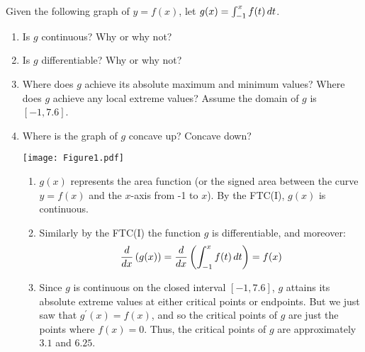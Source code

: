 \documentclass[nooutcomes]{ximera}
\begin{document}
\begin{problem}
Given the following graph of $y=f(x)$, let $g(x) = \int_{-1}^x f(t) \,d t$.
	\begin{enumerate}
	
	\item  Is $g$ continuous?  Why or why not?
		
		
		
		
	\item  Is $g$ differentiable?  Why or why not?
		
		
		
		
	\item  Where does $g$ achieve its absolute maximum and minimum values?  Where does $g$ achieve any local extreme values?  Assume the domain of $g$ is $[-1,7.6]$.
		
		
		
		
	\item  Where is the graph of $g$ concave up?  Concave down?
		
		
\begin{image}
\texttt{[image: Figure1.pdf]}
\end{image}

		\begin{freeResponse}
			\begin{enumerate}
			\item  $g(x)$ represents the area function (or the signed area between the curve$y=f(x)$ and the $x$-axis from -1 to $x$).  By the FTC(I), $g(x)$ is continuous.
			
			\item  Similarly by the FTC(I) the function $g$ is differentiable, and moreover:
			$$\frac{d}{dx} \left( g(x) \right) = \frac{d}{dx} \left( \int_{-1}^x f(t) \,d t \right)= f(x)$$
			
			\item  Since $g$ is continuous on the closed interval $[-1,7.6]$, $g$ attains its absolute extreme values at either critical points or endpoints.  
			But we just saw that $g^\prime(x) = f(x)$, and so the critical points of $g$ are just the points where $f(x) = 0$.  
			Thus, the critical points of $g$ are approximately $3.1$ and $6.25$.
			

\end{enumerate}
\end{freeResponse}
\end{enumerate}
\end{problem}
\end{document}
